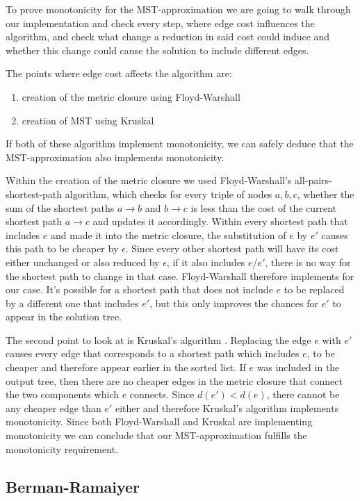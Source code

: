 To prove monotonicity for the MST-approximation we are going to walk through our implementation and check every step, where edge cost influences the algorithm, and check what change a reduction in said cost could induce and whether this change could cause the solution to include different edges.

The points where edge cost affects the algorithm are:
\begin{enumerate}
\item creation of the metric closure using Floyd-Warshall 
\item creation of MST using Kruskal
\end{enumerate}

If both of these algorithm implement monotonicity, we can safely deduce that the MST-approximation also implements monotonicity.

Within the creation of the metric closure we used Floyd-Warshall's all-pairs-shortest-path algorithm, which checks for every triple of nodes $a,b,c$, whether the sum of the shortest paths $a\to b$ and $b\to c$ is less than the cost of the current shortest path $a\to c$ and updates it accordingly. Within every shortest path that includes $e$ and made it into the metric closure, the substitution of $e$ by $e'$ causes this path to be cheaper by $\epsilon$. Since every other shortest path will have its cost either unchanged or also reduced by $\epsilon$, if it also includes $e$/$e'$, there is no way for the shortest path to change in that case. Floyd-Warshall therefore implements for our case. It's possible for a shortest path that does not include $e$ to be replaced by a different one that includes $e'$, but this only improves the chances for $e'$ to appear in the solution tree.

The second point to look at is Kruskal's algorithm \cite{kruskal1956shortest}. Replacing the edge $e$ with $e'$ causes every edge that corresponds to a shortest path which includes $e$, to be cheaper and therefore appear earlier in the sorted list. If $e$ was included in the output tree, then there are no cheaper edges in the metric closure that connect the two components which $e$ connects. Since $d(e')<d(e)$, there cannot be any cheaper edge than $e'$ either and therefore Kruskal's algorithm implements monotonicity. Since both Floyd-Warshall and Kruskal are implementing monotonicity we can conclude that our MST-approximation fulfills the monotonicity requirement.

\subsection{Berman-Ramaiyer}

